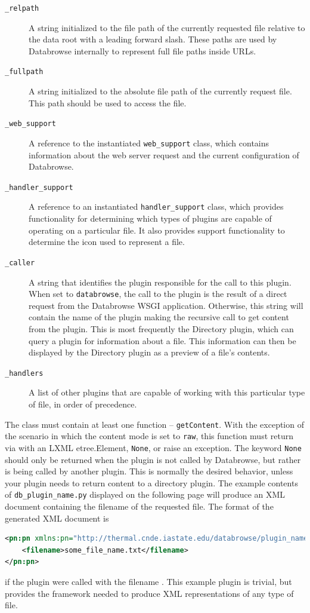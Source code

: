 \documentclass[10pt]{article}
\begin{document}
\begin{description}
	\item[\texttt{\_relpath}] A string initialized to the file path of the currently requested file relative to the data root with a leading forward slash.  These paths are used by Databrowse internally to represent full file paths inside URLs.
	\item[\texttt{\_fullpath}] A string initialized to the absolute file path of the currently request file.  This path should be used to access the file.
	\item[\texttt{\_web\_support}] A reference to the instantiated \texttt{web\_support} class, which contains information about the web server request and the current configuration of Databrowse.
	\item[\texttt{\_handler\_support}] A reference to an instantiated \texttt{handler\_support} class, which provides functionality for determining which types of plugins are capable of operating on a particular file.  It also provides support functionality to determine the icon used to represent a file.
	\item[\texttt{\_caller}] A string that identifies the plugin responsible for the call to this plugin.  When set to \texttt{databrowse}, the call to the plugin is the result of a direct request from the Databrowse WSGI application.  Otherwise, this string will contain the name of the plugin making the recursive call to get content from the plugin.  This is most frequently the Directory plugin, which can query a plugin for information about a file.  This information can then be displayed by the Directory plugin as a preview of a file's contents.
	\item[\texttt{\_handlers}] A list of other plugins that are capable of working with this particular type of file, in order of precedence.
\end{description}

The class must contain at least one function -- \texttt{getContent}.  With the exception of the scenario in which the content mode is set to \texttt{raw}, this function must return via with an LXML etree.Element, \texttt{None}, or raise an exception.  The keyword \texttt{None} should only be returned when the plugin is not called by Databrowse, but rather is being called by another plugin.  This is normally the desired behavior, unless your plugin needs to return content to a directory plugin.  The example contents of \texttt{db\_plugin\_name.py} displayed on the following page will produce an XML document containing the filename of the requested file.  The format of the generated XML document is
\begin{lstlisting}[language=XML]
<pn:pn xmlns:pn="http://thermal.cnde.iastate.edu/databrowse/plugin_name">
	<filename>some_file_name.txt</filename>
</pn:pn>
\end{lstlisting}
if the plugin were called with the filename .  This example plugin is trivial, but provides the framework needed to produce XML representations of any type of file.
\end{document}
